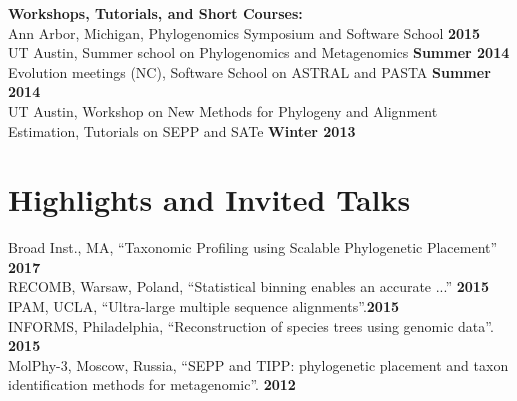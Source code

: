 \documentclass[margin,line,letterpaper]{resume}
\begin{document}
\begin{resume}
    \textbf{Workshops, Tutorials, and  Short Courses:}\vspace{2mm}\\\vspace{1mm}%
    Ann Arbor, Michigan, Phylogenomics Symposium and Software School \hfill \textbf{2015}\\
    UT Austin, Summer school on Phylogenomics and Metagenomics \hfill \textbf{Summer 2014}\\
    Evolution meetings (NC), Software School on ASTRAL and PASTA \hfill \textbf{Summer 2014}\\
    UT Austin, Workshop on New Methods for Phylogeny and Alignment Estimation, 
    Tutorials on SEPP and SATe \hfill \textbf{Winter 2013}
%

    
    
        \section{\mysidestyle Highlights and Invited Talks}
        Broad Inst., MA, ``Taxonomic Profiling using Scalable Phylogenetic Placement'' \hfill \textbf{2017}\\
         RECOMB, Warsaw, Poland, ``Statistical binning enables an accurate ...''   \hfill \textbf{2015}\\
         IPAM, UCLA, ``Ultra-large multiple sequence alignments''.\hfill \textbf{2015}\\
         INFORMS, Philadelphia, ``Reconstruction of species trees using genomic data''.   \hfill \textbf{2015}\\
         MolPhy-3, Moscow, Russia, ``SEPP and TIPP: phylogenetic placement and taxon identification methods for metagenomic''. \hfill \textbf{2012}\vspace{1mm}

\end{resume}
\end{document}
